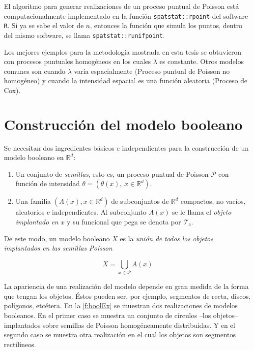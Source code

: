 El algoritmo para generar realizaciones de un proceso puntual de Poisson est\'a computacionalmente implementado en la funci\'on \verb|spatstat::rpoint| del software \verb|R|. Si ya se sabe el valor de $n$, entonces la funci\'on que simula los puntos, dentro del mismo software, se llama \verb|spatstat::runifpoint|.

Los mejores ejemplos para la metodolog\'ia mostrada en esta tesis se obtuvieron con procesos puntuales homog\'eneos en los cuales $\lambda$ es constante. Otros modelos comunes son cuando $\lambda$ var\'ia espacialmente (Proceso puntual de Poisson no homog\'eneo) y cuando la intensidad espacial es una funci\'on aleatoria (Proceso de Cox).

\section{Construcci\'on del modelo booleano}

Se necesitan dos ingredientes b\'asicos e independientes para la construcci\'on de un modelo booleano en $\mathbb{R}^d$:

\begin{enumerate}
\item Un conjunto de \textit{semillas}, esto es, un proceso puntual de Poisson $\mathcal{P}$ con funci\'on de intensidad $\theta=(\theta(x),\ x\in\mathbb{R}^d)$.
    \item Una familia $(A(x),x\in\mathbb{R}^d)$ de subconjuntos de $\mathbb{R}^d$ compactos, no vac\'ios, aleatorios e independientes. Al subconjunto $A(x)$ se le llama el \textit{objeto implantado en} $x$ y su funcional que pega se denota por $\mathcal{T}_x$.
\end{enumerate}

De este modo, un modelo booleano $X$ es la \textit{uni\'on de todos los objetos implantados en las semillas Poisson}

\[X=\bigcup_{x\in\mathcal{P}}A(x)\]

La apariencia de una realizaci\'on del modelo depende en gran medida de la forma que tengan los objetos. \'Estos pueden ser, por ejemplo, segmentos de recta, discos, pol\'igonos, etc\'etera. En la \autoref{f:boolEx} se muestran dos realizaciones de modelos booleanos. En el primer caso se muestra un conjunto de c\'irculos --los objetos-- implantados sobre semillas de Poisson homog\'eneamente distribuidas. Y en el segundo caso se muestra otra realizaci\'on en el cual los objetos son segmentos rectil\'ineos.

